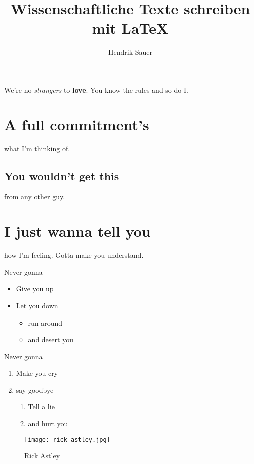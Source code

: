 \documentclass[a4]{article}
\title{Wissenschaftliche Texte schreiben mit \LaTeX}
\author{Hendrik Sauer}
\begin{document}
\maketitle

We're no \emph{strangers} to \textbf{love}.
You know the rules and so do I.

\section{A full commitment's}\label{sec:first-verse}

what I'm thinking of.

\subsection{You wouldn't get this}

from any other guy.

\section*{I just wanna tell you}

how I'm feeling.
Gotta make you understand.

Never gonna
\begin{itemize}
    \item Give you up
    \item Let you down
    \begin{itemize}
        \item run around
        \item and desert you
    \end{itemize}
\end{itemize}

Never gonna
\begin{enumerate}
    \item Make you cry
    \item say goodbye
    \begin{enumerate}
        \item Tell a lie
        \item and hurt you
    \end{enumerate}
\end{enumerate}

\begin{figure}
    \centering
    \texttt{[image: rick-astley.jpg]}
    \caption{Rick Astley}
    \label{fig:rick-astley}
\end{figure}
\end{document}
